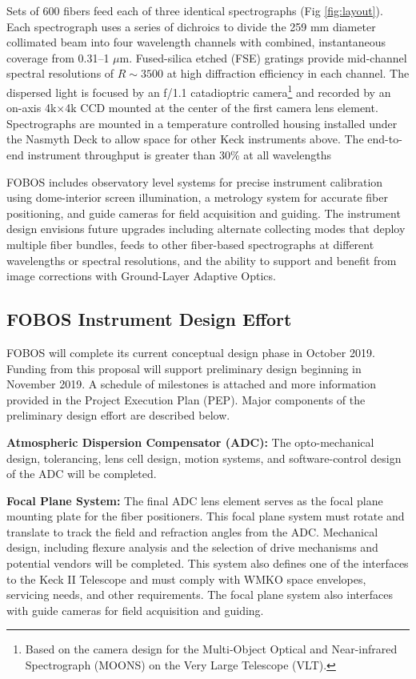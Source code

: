\documentclass[oneside,11pt]{amsart}
\newcommand{\comment}[2][todo]{{\color{#1}[[{\bf #2}]]}}
\begin{document}
Sets of 600 fibers feed each of three identical spectrographs (Fig
\ref{fig:layout}).  Each spectrograph uses a series of dichroics to
divide the 259 mm diameter collimated beam into four wavelength channels with combined, instantaneous
coverage from 0.31--1 $\mu$m.  Fused-silica etched (FSE) gratings provide mid-channel spectral resolutions of $R
\sim 3500$ at high diffraction efficiency in each channel.  The dispersed light is focused by an f/1.1
catadioptric camera\footnote{Based on the camera design for the Multi-Object Optical and Near-infrared Spectrograph (MOONS) on the Very Large Telescope (VLT).} and recorded by an on-axis 4k$\times$4k CCD mounted
at the center of the first camera lens element.  Spectrographs are
mounted in a temperature controlled housing installed under the Nasmyth
Deck to allow space for other Keck instruments above.  The end-to-end
instrument throughput is greater than 30\% at all wavelengths

FOBOS includes observatory level systems for precise instrument
calibration using dome-interior screen illumination, a metrology system
for accurate fiber positioning, and guide cameras for field acquisition
and guiding.  The instrument design envisions future upgrades including
alternate collecting modes that deploy multiple fiber bundles, feeds to
other fiber-based spectrographs at different wavelengths or spectral
resolutions, and the ability to support and benefit from image
corrections with Ground-Layer Adaptive Optics.

\subsection{FOBOS Instrument Design Effort}
\label{sec:design}

FOBOS will complete its current conceptual design phase in October 2019.
Funding from this proposal will support preliminary design beginning in
November 2019.  A schedule of milestones is attached and more
information provided in the Project Execution Plan (PEP).  Major
components of the preliminary design effort are described below.

\noindent \textbf{Atmospheric Dispersion Compensator (ADC):} The
opto-mechanical design, tolerancing, lens cell design, motion systems,
and software-control design of the ADC will be completed.  

\noindent \textbf{Focal Plane System:} The final ADC lens element serves
as the focal plane mounting plate for the fiber positioners.  This focal
plane system must rotate and translate to track the field and refraction
angles from the ADC.  Mechanical design, including flexure analysis and
the selection of drive mechanisms and potential vendors will be
completed.  This system also defines one of the interfaces to the Keck
II Telescope and must comply with WMKO space envelopes, servicing needs,
and other requirements.  The focal plane system also interfaces with
guide cameras for field acquisition and guiding.
\end{document}
